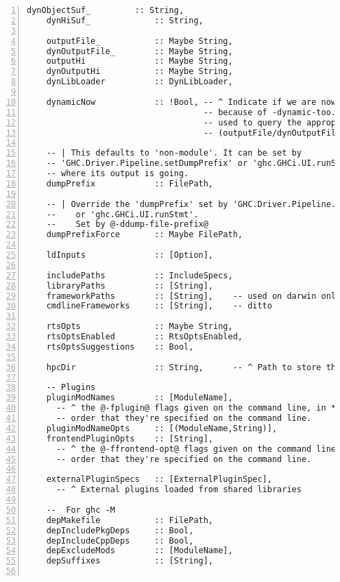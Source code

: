\documentclass[en]{pracamgr}
\begin{document}
\begin{lstlisting}[numbers=left,stepnumber=1]
    dynObjectSuf_         :: String,
    dynHiSuf_             :: String,
  
    outputFile_           :: Maybe String,
    dynOutputFile_        :: Maybe String,
    outputHi              :: Maybe String,
    dynOutputHi           :: Maybe String,
    dynLibLoader          :: DynLibLoader,
  
    dynamicNow            :: !Bool, -- ^ Indicate if we are now generating dynamic output
                                    -- because of -dynamic-too. This predicate is
                                    -- used to query the appropriate fields
                                    -- (outputFile/dynOutputFile, ways, etc.)
  
    -- | This defaults to 'non-module'. It can be set by
    -- 'GHC.Driver.Pipeline.setDumpPrefix' or 'ghc.GHCi.UI.runStmt' based on
    -- where its output is going.
    dumpPrefix            :: FilePath,
  
    -- | Override the 'dumpPrefix' set by 'GHC.Driver.Pipeline.setDumpPrefix'
    --    or 'ghc.GHCi.UI.runStmt'.
    --    Set by @-ddump-file-prefix@
    dumpPrefixForce       :: Maybe FilePath,
  
    ldInputs              :: [Option],
  
    includePaths          :: IncludeSpecs,
    libraryPaths          :: [String],
    frameworkPaths        :: [String],    -- used on darwin only
    cmdlineFrameworks     :: [String],    -- ditto
  
    rtsOpts               :: Maybe String,
    rtsOptsEnabled        :: RtsOptsEnabled,
    rtsOptsSuggestions    :: Bool,
  
    hpcDir                :: String,      -- ^ Path to store the .mix files
  
    -- Plugins
    pluginModNames        :: [ModuleName],
      -- ^ the @-fplugin@ flags given on the command line, in *reverse*
      -- order that they're specified on the command line.
    pluginModNameOpts     :: [(ModuleName,String)],
    frontendPluginOpts    :: [String],
      -- ^ the @-ffrontend-opt@ flags given on the command line, in *reverse*
      -- order that they're specified on the command line.
  
    externalPluginSpecs   :: [ExternalPluginSpec],
      -- ^ External plugins loaded from shared libraries
  
    --  For ghc -M
    depMakefile           :: FilePath,
    depIncludePkgDeps     :: Bool,
    depIncludeCppDeps     :: Bool,
    depExcludeMods        :: [ModuleName],
    depSuffixes           :: [String],
  

\end{lstlisting}
\end{document}
